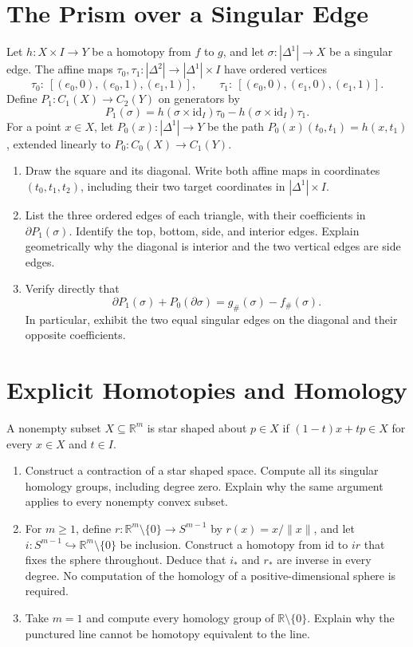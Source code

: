 \documentclass[11pt]{article}
\begin{document}
\section{The Prism over a Singular Edge}
Let $h:X\times I\to Y$ be a homotopy from $f$ to $g$, and let $\sigma:|\Delta^1|\to X$ be a singular edge. The affine maps $\tau_0,\tau_1:|\Delta^2|\to|\Delta^1|\times I$ have ordered vertices
\[
\tau_0:\ [(e_0,0),(e_0,1),(e_1,1)],\qquad
\tau_1:\ [(e_0,0),(e_1,0),(e_1,1)].
\]
Define $P_1:C_1(X)\to C_2(Y)$ on generators by
\[
P_1(\sigma)=h(\sigma\times\mathrm{id}_I)\tau_0-h(\sigma\times\mathrm{id}_I)\tau_1.
\]
For a point $x\in X$, let $P_0(x):|\Delta^1|\to Y$ be the path $P_0(x)(t_0,t_1)=h(x,t_1)$, extended linearly to $P_0:C_0(X)\to C_1(Y)$.
\begin{enumerate}
\item Draw the square and its diagonal. Write both affine maps in coordinates $(t_0,t_1,t_2)$, including their two target coordinates in $|\Delta^1|\times I$.
\item List the three ordered edges of each triangle, with their coefficients in $\partial P_1(\sigma)$. Identify the top, bottom, side, and interior edges. Explain geometrically why the diagonal is interior and the two vertical edges are side edges.
\item Verify directly that
\[
\partial P_1(\sigma)+P_0(\partial\sigma)=g_\#(\sigma)-f_\#(\sigma).
\]
In particular, exhibit the two equal singular edges on the diagonal and their opposite coefficients.
\end{enumerate}

\section{Explicit Homotopies and Homology}
A nonempty subset $X\subseteq\mathbb R^m$ is star shaped about $p\in X$ if $(1-t)x+tp\in X$ for every $x\in X$ and $t\in I$.
\begin{enumerate}
\item Construct a contraction of a star shaped space. Compute all its singular homology groups, including degree zero. Explain why the same argument applies to every nonempty convex subset.
\item For $m\geq1$, define $r:\mathbb R^m\setminus\{0\}\to S^{m-1}$ by $r(x)=x/\|x\|$, and let $i:S^{m-1}\hookrightarrow\mathbb R^m\setminus\{0\}$ be inclusion. Construct a homotopy from $\mathrm{id}$ to $ir$ that fixes the sphere throughout. Deduce that $i_*$ and $r_*$ are inverse in every degree. No computation of the homology of a positive-dimensional sphere is required.
\item Take $m=1$ and compute every homology group of $\mathbb R\setminus\{0\}$. Explain why the punctured line cannot be homotopy equivalent to the line.
\end{enumerate}
\end{document}
